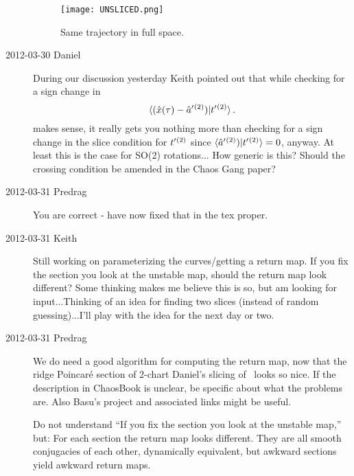 \begin{description}
\begin{figure}
\begin{center}
  \texttt{[image: UNSLICED.png]}
\end{center}
  \caption{
  Same trajectory in full space.}
\label{fig:unsliced}
\end{figure}


\item[2012-03-30 Daniel]
During our discussion yesterday Keith pointed out that while checking for
a sign change in
\[
\braket{(\sspRed(\zeit)- \slicep{}^{(2)})}{\sliceTan{}{}^{(2)}}
\,.
\]
makes sense, it really gets you nothing more than checking for a sign
change in the slice condition for $t'_{}{}^{(2)}$ since
$\braket{\slicep{}^{(2)})}{\sliceTan{}{}^{(2)}} = 0$, anyway. At least
this is the case for SO(2) rotations... How generic is this? Should the
crossing condition be amended in the Chaos Gang paper?

\item[2012-03-31 Predrag] You are correct - have now fixed that in the
tex proper.

\item[2012-03-31 Keith] Still working on parameterizing the
curves/getting a return map.  If you fix the section you look at the
unstable map, should the return map look different?  Some thinking makes
me believe this is so, but am looking for input...Thinking of an idea for
finding two slices (instead of random guessing)...I'll play with the idea
for the next day or two.

\item[2012-03-31 Predrag] We do need a good algorithm for computing the
return map, now that the ridge Poincar\'e section of 2-chart Daniel's
slicing of \cLe\ looks so nice. If the description in ChaosBook is
unclear, be specific about what the problems are. Also
{Basu's project} and associated links might be useful.

Do not understand ``If you fix the section you look at the unstable
map,'' but: For each section the return map looks different. They are all
smooth conjugacies of each other, dynamically equivalent, but awkward
sections yield awkward return maps.


\end{description}
